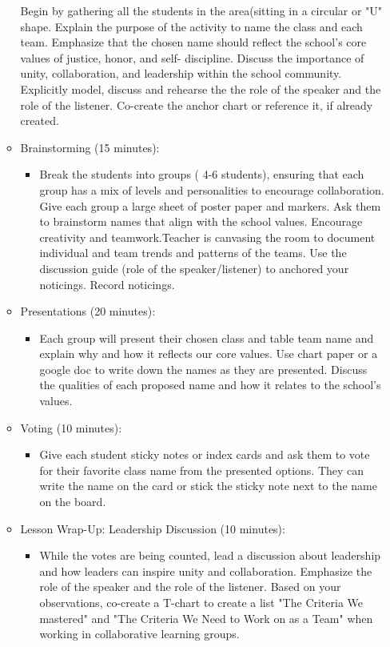 \documentclass[14pt, letterpaper, twoside]{article}
\begin{document}
\begin{itemize}
\begin{itemize}
    		Begin by gathering all the students in the area(sitting in a 						circular or "U" shape. Explain the purpose of the activity to name 				the class and each team. Emphasize that the chosen name should 					reflect the school's core values of justice, honor, and self-						discipline. Discuss the importance of unity, collaboration, and 					leadership 	within the school community. Explicitly model, discuss 				and rehearse the the role of the speaker and the role of the 						listener. Co-create the anchor chart or reference it, if already					created.
    	\item Brainstorming (15 minutes):
    		\begin{itemize}
    		\item Break the students into groups ( 4-6 students), ensuring that 				each group has a mix of levels and personalities to encourage 					collaboration. Give each group a large sheet of poster paper and 					markers. Ask them to brainstorm names that align with the school 					values. Encourage creativity and teamwork.Teacher is canvasing the 				room to document individual and team trends and patterns of the 					teams. Use the discussion guide (role of the speaker/listener) to 				anchored your noticings. Record noticings.
    		\end{itemize}
    	\item Presentations (20 minutes):
    		\begin{itemize}
    		\item Each group will present their chosen class and table team name 			and explain why and how it reflects our core values. Use chart paper 			or a google doc to write down the names as they are presented. 					Discuss the qualities of each proposed name and how it relates to 				the school's values.
    		\end{itemize}
    	\item Voting (10 minutes):
    		\begin{itemize}
    		\item Give each student sticky notes or index cards and ask them to 				vote for their favorite class name from the presented options. They 				can write the name on the card or stick the sticky note next to the 				name on the board.
    		\end{itemize}
    	\item Lesson Wrap-Up: Leadership Discussion (10 minutes):
		\begin{itemize}
    		\item While the votes are being counted, lead a discussion about leadership and how leaders can inspire unity and collaboration. Emphasize the role of the speaker and the role of the listener. Based on your observations, co-create a T-chart to create a list "The Criteria We mastered" and "The Criteria We Need to Work on as a Team" when working in collaborative learning groups.

\end{itemize}
\end{itemize}
\end{itemize}
\end{document}
